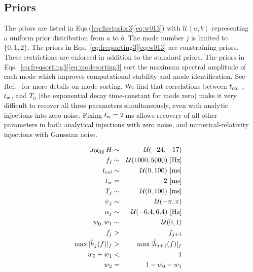 \documentclass[../Thesis.tex]{subfiles}
\begin{document}
\begin{subappendices}


\renewcommand\thefigure{\thesection.\arabic{figure}} 
\renewcommand\thetable{\thesection.\arabic{table}} 
\setcounter{figure}{0} 
\setcounter{table}{0} 



\section{Priors}
\label{appendix:a3}
    The priors are listed in Eqs.(\ref{eq:firstprior3}\Hyphdash*\ref{eq:w013}) with $\mathcal{U}(a,b)$ representing a uniform prior distribution from $a$ to $b$. 
    The mode number $j$ is limited to $\lbrace 0,1,2 \rbrace$. 
    The priors in Eqs.~\ref{eq:freqsorting3}\Hyphdash*\ref{eq:w013} are constraining priors. 
    These restrictions are enforced in addition to the standard priors. 
    The priors in Eqs.~\ref{eq:freqsorting3}\Hyphdash*\ref{eq:modesorting3} sort the maximum spectral amplitude of each mode which improves computational stability and mode identification.
    See Ref.~\cite{Easter2020} for more details on mode sorting.
    We find that correlations between $t_{\mathrm{col}}$ , $t_{\mathrm{w}}$, and $T_0$ (the exponential decay time-constant for mode zero) make it very difficult to recover all three parameters simultaneously, even with analytic injections into zero noise.
    Fixing $t_{\mathrm{w}}=2$\,ms allows recovery of all other parameters in both analytical injections with zero noise, and numerical-relativity injections with Gaussian noise.
    
    
    \begin{eqnarray}
        \log_{10}{H} & \sim & \mathcal{U}(-24, -17)\label{eq:firstprior3}  \\
        f_j & \sim & \mathcal{U}(1000,5000)\  [\mathrm{Hz}]\\
        t_{\mathrm{col}} & \sim & \mathcal{U}(0,100)\  [\mathrm{ms}]\\
        t_{\mathrm{w}} & = & 2\  [\mathrm{ms}]\\
        T_j & \sim & \mathcal{U}(0,100)\ [\mathrm{ms}]\\
        \psi_j & \sim & \mathcal{U}(-\pi,\pi) \\
        \alpha_j & \sim & \mathcal{U}(-6.4,6.4)\   [\mathrm{Hz}] \\
        w_0, w_1 & \sim & \mathcal{U}(0,1)\label{eq:lastprior3}\\
        f_{j}  & > & f_{j+1}\label{eq:freqsorting3}\\
        \max|\tilde{h}_{j}(f)|_f & > & \max|\tilde{h}_{j+1}(f)|_f \label{eq:modesorting3}\\
        w_0+w_1 & < & 1  \label{eq:w013}\\
        w_2 & = & 1 - w_0 - w_1 \label{eq:w23}
    \end{eqnarray}
    \pagebreak
    

\end{subappendices}
\end{document}
